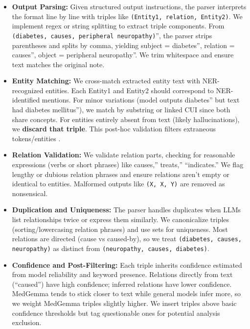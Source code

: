 \begin{itemize}
\item \textbf{Output Parsing:} Given structured output instructions, the parser interprets the format line by line with triples like \texttt{(Entity1, relation, Entity2)}. We implement regex or string splitting to extract triple components. From \texttt{(diabetes, causes, peripheral neuropathy)}'', the parser strips parentheses and splits by comma, yielding subject = diabetes'', relation = causes'', object = peripheral neuropathy''. We trim whitespace and ensure text matches the original note.

\item \textbf{Entity Matching:} We cross-match extracted entity text with NER-recognized entities. Each Entity1 and Entity2 should correspond to NER-identified mentions. For minor variations (model outputs diabetes'' but text had diabetes mellitus''), we match by substring or linked CUI since both share concepts. For entities entirely absent from text (likely hallucinations), we \textbf{discard that triple}. This post-hoc validation filters extraneous tokens/entities \parencite{Ji2023}.

\item \textbf{Relation Validation:} We validate relation parts, checking for reasonable expressions (verbs or short phrases) like causes,'' treats,'' ``indicates.'' We flag lengthy or dubious relation phrases and ensure relations aren't empty or identical to entities. Malformed outputs like \texttt{(X, X, Y)} are removed as nonsensical.

\item \textbf{Duplication and Uniqueness:} The parser handles duplicates when LLMs list relationships twice or express them similarly. We canonicalize triples (sorting/lowercasing relation phrases) and use sets for uniqueness. Most relations are directed (cause vs caused-by), so we treat \texttt{(diabetes, causes, neuropathy)} as distinct from \texttt{(neuropathy, causes, diabetes)}.

\item \textbf{Confidence and Post-Filtering:} Each triple inherits confidence estimated from model reliability and keyword presence. Relations directly from text (``caused'') have high confidence; inferred relations have lower confidence. MedGemma tends to stick closer to text while general models infer more, so we weight MedGemma triples slightly higher. We insert triples above basic confidence thresholds but tag questionable ones for potential analysis exclusion.
\end{itemize}

